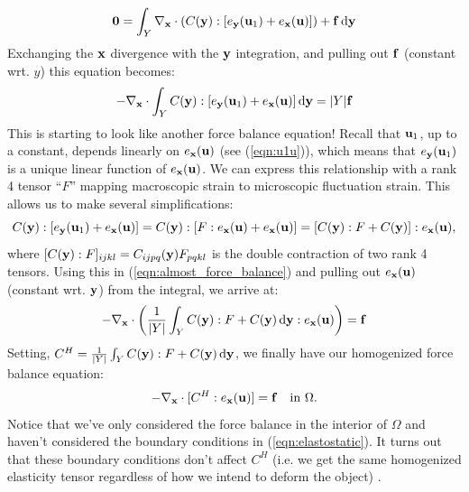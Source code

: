 \documentclass[10pt]{article}
\begin{document}
$$
{\bf 0} = \int_Y \nabla_{\bf x} \cdot (C({\bf y}) : [e_{\bf y}({\bf u}_1) + e_{\bf x}({\bf u})]) + {\bf f} \, \mathrm{d} {\bf y}
$$
Exchanging the ${\bf x}$ divergence with the ${\bf y}$ integration, and pulling
out ${\bf f}$ (constant wrt. $y$) this equation becomes:
\begin{equation}
\label{eqn:almost_force_balance}
-\nabla_{\bf x} \cdot \int_Y C({\bf y}) : [e_{\bf y}({\bf u}_1) + e_{\bf x}({\bf u})] \, \mathrm{d} {\bf y} = |Y| {\bf f}
\end{equation}
This is starting to look like another force balance equation! Recall that ${\bf
u}_1$, up to a constant, depends linearly on $e_{\bf x}({\bf u})$ (see
(\ref{eqn:u1u})), which means that $e_{\bf y}({\bf u}_1)$ is a unique linear
function of $e_{\bf x}({\bf u})$. We can express this relationship with a rank
4 tensor ``$F$'' mapping macroscopic strain to microscopic fluctuation strain.
This allows us to make several simplifications:
$$
C({\bf y}) : [e_{\bf y}({\bf u}_1) + e_{\bf x}({\bf u})] = 
C({\bf y}) : [F : e_{\bf x}({\bf u}) + e_{\bf x}({\bf u})] = 
[C({\bf y}): F + C({\bf y})] : e_{\bf x}({\bf u}),
$$
where $[C({\bf y}) : F]_{ijkl} = C_{ijpq}({\bf y}) F_{pqkl}$ is the double
contraction of two rank 4 tensors. Using this in
(\ref{eqn:almost_force_balance}) and pulling out $e_{\bf x}({\bf u})$ (constant
wrt. ${\bf y}$) from the integral, we arrive at:
$$
-\nabla_{\bf x} \cdot \left( \frac{1}{|Y|} \int_Y C({\bf y}) : F + C({\bf y}) \, \mathrm{d} {\bf y} : e_{\bf x}({\bf u}) \right) = {\bf f}
$$
Setting, $C^H = \frac{1}{|Y|} \int_Y C({\bf y}) : F + C({\bf y}) \, \mathrm{d}
{\bf y}$, we finally have our homogenized force balance equation:
\begin{equation}
    \label{eqn:homogenized}
    -\nabla_{\bf x} \cdot [C^H : e_{\bf x}({\bf u}) ] = {\bf f} \quad \text{in } \Omega.
\end{equation}
Notice that we've only considered the force balance in the interior of $\Omega$
and haven't considered the boundary conditions in (\ref{eqn:elastostatic}). It
turns out that these boundary conditions don't affect $C^H$ (i.e. we get the same
homogenized elasticity tensor regardless of how we intend to deform the object)
\cite[Remark 3.1]{defranceschi1993}.
\end{document}
